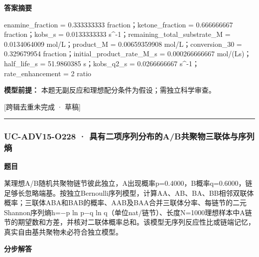 \documentclass[UTF8,11pt,a4paper]{ctexart}
\begin{document}
\noindent\textbf{答案摘要}\par
enamine\_fraction = 0.333333333 fraction；ketone\_fraction = 0.666666667 fraction；kobs\_s = 0.0133333333 s\textasciicircum{}-1；remaining\_total\_substrate\_M = 0.0134064009 mol/L；product\_M = 0.00659359908 mol/L；conversion\_30 = 0.329679954 fraction；initial\_product\_rate\_M\_s = 0.000266666667 mol/(Ls)；half\_life\_s = 51.9860385 s；kobs\_q2\_s = 0.0266666667 s\textasciicircum{}-1；rate\_enhancement = 2 ratio\par
\noindent\textbf{模型前提：}
本题无副反应和理想配分条件为假设；需独立科学审查。\par
\noindent\textcolor{red!65!black}{[跨辑去重未完成 · 草稿]} \par
\medskip\hrule\medskip
{}
\subsubsection*{UC-ADV15-O228 · 具有二项序列分布的A/B共聚物三联体与序列熵}
\noindent\textbf{题目}\par
某理想A/B随机共聚物链节彼此独立，A出现概率p=0.4000，B概率q=0.6000，链足够长忽略端基。按独立Bernoulli序列模型，计算AA、AB、BA、BB相邻双联体概率；三联体ABA和BAB的概率、AAB及BAA合并三联体分率、每链节的二元Shannon序列熵h=−p ln p−q ln q（单位nat/链节）、长度N=1000理想样本中A链节的期望数和方差，并核对二联体概率总和。该模型无序列反应性比或链端记忆，真实自由基共聚物未必符合独立模型。\par
\medskip\noindent\textbf{分步解答}
\end{document}
